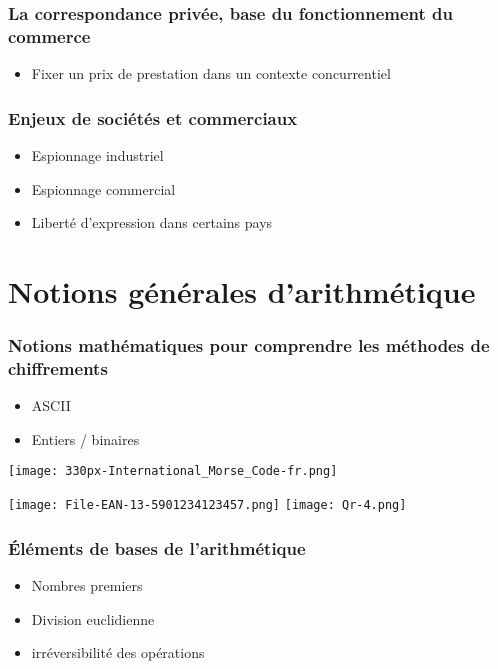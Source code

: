 \documentclass[french]{beamer}
\begin{document}
\begin{frame}
  \frametitle{La correspondance privée, base du fonctionnement du
  commerce}
  \begin{itemize}
    \item Fixer un prix de prestation dans un contexte concurrentiel
  \end{itemize}
\end{frame}

\begin{frame}
  \frametitle{Enjeux de sociétés et commerciaux}
  \begin{itemize}
    \item Espionnage industriel
    \item Espionnage commercial
    \item Liberté d'expression dans certains pays
  \end{itemize}
\end{frame}

\section{Notions générales d'arithmétique}
\begin{frame}
  \frametitle{Notions mathématiques pour comprendre les méthodes de
  chiffrements}
  \begin{multicols}{2}
    \begin{block}{}
      \begin{itemize}
        \item ASCII
        \item Entiers / binaires
      \end{itemize}
    \end{block}
    \columnbreak
    \begin{block}{}
      \texttt{[image: 330px-International\_Morse\_Code-fr.png]}

      \texttt{[image: File-EAN-13-5901234123457.png]}
      \texttt{[image: Qr-4.png]}
    \end{block}
  \end{multicols}
\end{frame}

\begin{frame}
  \frametitle{Éléments de bases de l'arithmétique}
  \begin{itemize}
    \item Nombres premiers
    \item Division euclidienne
    \item irréversibilité des opérations
  \end{itemize}
\end{frame}
\end{document}
